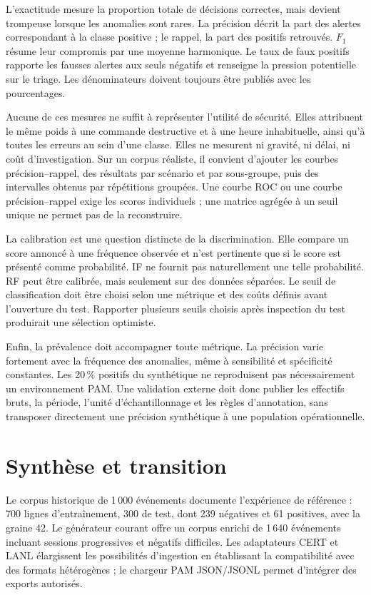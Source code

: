 \documentclass[11pt,a4paper,oneside]{report}
\theoremstyle{definition}
\theoremstyle{plain}
\begin{document}
L'exactitude mesure la proportion totale de décisions correctes, mais devient
trompeuse lorsque les anomalies sont rares. La précision décrit la part des
alertes correspondant à la classe positive ; le rappel, la part des positifs
retrouvés. $F_1$ résume leur compromis par une moyenne harmonique. Le taux de
faux positifs rapporte les fausses alertes aux seuls négatifs et renseigne la
pression potentielle sur le triage. Les dénominateurs doivent toujours être
publiés avec les pourcentages.

Aucune de ces mesures ne suffit à représenter l'utilité de sécurité. Elles
attribuent le même poids à une commande destructive et à une heure inhabituelle,
ainsi qu'à toutes les erreurs au sein d'une classe. Elles ne mesurent ni
gravité, ni délai, ni coût d'investigation. Sur un corpus réaliste, il convient
d'ajouter les courbes précision--rappel, des résultats par scénario et par
sous-groupe, puis des intervalles obtenus par répétitions groupées. Une courbe
ROC ou une courbe précision--rappel exige les scores individuels ; une matrice
agrégée à un seuil unique ne permet pas de la reconstruire.

La calibration est une question distincte de la discrimination. Elle compare
un score annoncé à une fréquence observée et n'est pertinente que si le score
est présenté comme probabilité. IF ne fournit pas naturellement une telle
probabilité. RF peut être calibrée, mais seulement sur des données séparées.
Le seuil de classification doit être choisi selon une métrique et des coûts
définis avant l'ouverture du test. Rapporter plusieurs seuils choisis après
inspection du test produirait une sélection optimiste.

Enfin, la prévalence doit accompagner toute métrique. La précision varie
fortement avec la fréquence des anomalies, même à sensibilité et spécificité
constantes. Les 20\,\% positifs du synthétique ne reproduisent pas
nécessairement un environnement PAM. Une validation externe doit donc publier
les effectifs bruts, la période, l'unité d'échantillonnage et les règles
d'annotation, sans transposer directement une précision synthétique à une
population opérationnelle.

\section{Synthèse et transition}

Le corpus historique de 1\,000 événements documente l'expérience de référence
: 700 lignes d'entraînement, 300 de test, dont 239 négatives et 61 positives,
avec la graine 42. Le générateur courant offre un corpus enrichi de 1\,640
événements incluant sessions progressives et négatifs difficiles. Les
adaptateurs CERT et LANL élargissent les possibilités d'ingestion en
établissant la compatibilité avec des formats hétérogènes ; le chargeur PAM
JSON/JSONL permet d'intégrer des exports autorisés.
\end{document}
